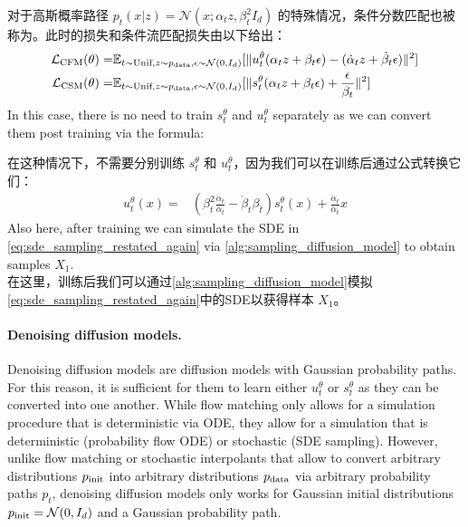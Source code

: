 \begin{summarybox}
对于高斯概率路径 $p_t(x|z)=\mathcal{N}(x;\alpha_tz,\beta_t^2I_d)$ 的特殊情况，条件分数匹配也被称为。此时的损失和条件流匹配损失由以下给出：
\begin{align*}
        \mathcal{L}_{\text{CFM}}(\theta) =&\mathbb{E}_{t\sim\text{Unif},z\sim p_{\rm{data}}, \epsilon\sim \mathcal{N}(0,I_d)}[\|u_t^\theta(\alpha_tz+\beta_t\epsilon)-(\dot{\alpha}_tz+\dot{\beta}_t\epsilon)\|^2]\\
        \mathcal{L}_{\text{CSM}}(\theta)=&\mathbb{E}_{t\sim\text{Unif},z\sim p_{\rm{data}}, \epsilon\sim \mathcal{N}(0,I_d)}[\|s_t^\theta(\alpha_tz+\beta_t\epsilon)+\frac{\epsilon}{\beta_t}\|^2]
\end{align*}
In this case, there is no need to train $s_t^\theta$ and $u_t^\theta$ separately as we can convert them post training via the formula:

在这种情况下，不需要分别训练 $s_t^\theta$ 和 $u_t^\theta$，因为我们可以在训练后通过公式转换它们：
\begin{align*}
u_t^\theta(x)=&\left(\beta_t^2\frac{\dot{\alpha}_t}{\alpha_t}-\dot{\beta}_t\beta_t\right) s_t^\theta(x)+\frac{\dot{\alpha}_t}{\alpha_t}x
\end{align*}
Also here, after training we can simulate the SDE in \cref{eq:sde_sampling_restated_again} via \cref{alg:sampling_diffusion_model} to obtain samples $X_1$.\\

在这里，训练后我们可以通过\cref{alg:sampling_diffusion_model}模拟\cref{eq:sde_sampling_restated_again}中的SDE以获得样本 $X_1$。\\

\paragraph{Denoising diffusion models.} 
Denoising diffusion models are diffusion models with Gaussian probability paths. For this reason, it is sufficient for them to learn either $u_t^\theta$ or $s_t^\theta$ as they can be converted into one another. While flow matching only allows for a simulation procedure that is deterministic via ODE, they allow for a simulation that is deterministic (probability flow ODE) or stochastic (SDE sampling). However, unlike flow matching or stochastic interpolants that allow to convert arbitrary distributions $p_{\rm{init}}$ into arbitrary distributions $p_{\rm{data}}$ via arbitrary probability paths $p_t$, denoising diffusion models only works for Gaussian initial distributions $p_{\rm{init}}=\mathcal{N}(0,I_d)$ and a Gaussian probability path.\\


\end{summarybox}
